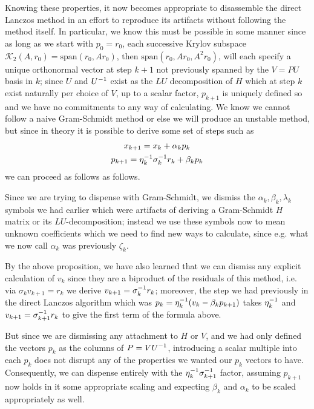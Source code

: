 \documentclass[11pt]{article}
\begin{document}
Knowing these properties, it now becomes appropriate to disassemble the direct Lanczos method in an effort to reproduce its artifacts without following the method itself. In particular, we know this must be possible in some manner since as long as we start with $p_0 = r_0$, each successive Krylov subspace $\mathcal K_2 (A , r_0) = \mathrm{span}(r_0,A r_0)$, then $ \mathrm{span}(r_0,Ar_0,A^2 r_0)$, will each specify a unique orthonormal vector at step $k+1$ not previously spanned by the $V = PU$ basis in $k$; since $U$ and $U^{-1}$ exist as the $LU$ decomposition of $H$ which at step $k$ exist naturally per choice of $V$, up to a scalar factor, $p_{k+1}$ is uniquely defined so and we have no commitments to any way of calculating. We know we cannot follow a naive Gram-Schmidt method or else we will produce an unstable method, but since in theory it is possible to derive some set of steps such as \begin{gather*}
x_{k+1} = x_k + \alpha_k p_k \\
p_{k+1} = \eta_k^{-1} \sigma_{k}^{-1} r_k + \beta_k p_k 
\end{gather*}
we can proceed as follows as follows.

Since we are trying to dispense with Gram-Schmidt, we dismiss the $\alpha_k, \beta_k, \lambda_k$ symbols we had earlier which were artifacts of deriving a Gram-Schmidt $H$ matrix or its $LU$-decomposition; instead we use these symbols now to mean unknown coefficients which we need to find new ways to calculate, since e.g. what we now call $\alpha_k$ was previously $\zeta_k$.

By the above proposition, we have also learned that we can dismiss any explicit calculation of $v_k$ since they are a biproduct of the residuals of this method, i.e. via $\sigma_{k} v_{k+1} = r_k$ we derive $v_{k+1} = \sigma^{-1}_{k} r_k$; moreover, the step we had previously in the direct Lanczos algorithm which was $p_k = \eta_k^{-1} (v_k - \beta_k p_{k+1})$ takes $\eta_k^{-1}$ and $v_{k+1} = \sigma^{-1}_{k+1} r_k$ to give the first term of the formula above.

But since we are dismissing any attachment to $H$ or $V$, and we had only defined the vectors $p_k$ as the columns of $P = VU^{-1}$, introducing a scalar multiple into each $p_k$ does not disrupt any of the properties we wanted our $p_k$ vectors to have. Consequently, we can dispense entirely with the $\eta_k^{-1} \sigma_{k+1}^{-1}$ factor, assuming $p_{k+1}$ now holds in it some appropriate scaling and expecting $\beta_k$ and $\alpha_k$ to be scaled appropriately as well.
\end{document}
